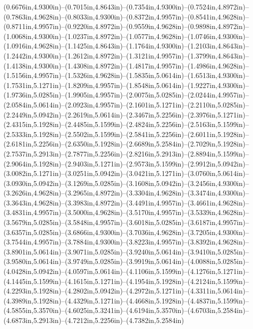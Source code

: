 (0.6676in,4.9300in)--(0.7015in,4.8643in)--(0.7354in,4.9300in)--(0.7524in,4.8972in)--(0.7863in,4.9628in)--(0.8033in,4.9300in)--(0.8372in,4.9957in)--(0.8541in,4.9628in)--(0.8711in,4.9957in)--(0.9220in,4.8972in)--(0.9559in,4.9628in)--(0.9898in,4.8972in)--(1.0068in,4.9300in)--(1.0237in,4.8972in)--(1.0577in,4.9628in)--(1.0746in,4.9300in)--(1.0916in,4.9628in)--(1.1425in,4.8643in)--(1.1764in,4.9300in)--(1.2103in,4.8643in)--(1.2442in,4.9300in)--(1.2612in,4.8972in)--(1.3121in,4.9957in)--(1.3799in,4.8643in)--(1.4138in,4.9300in)--(1.4308in,4.8972in)--(1.4817in,4.9957in)--(1.4986in,4.9628in)--(1.5156in,4.9957in)--(1.5326in,4.9628in)--(1.5835in,5.0614in)--(1.6513in,4.9300in)--(1.7531in,5.1271in)--(1.8209in,4.9957in)--(1.8548in,5.0614in)--(1.9227in,4.9300in)--(1.9736in,5.0285in)--(1.9905in,4.9957in)--(2.0075in,5.0285in)--(2.0244in,4.9957in)--(2.0584in,5.0614in)--(2.0923in,4.9957in)--(2.1601in,5.1271in)--(2.2110in,5.0285in)--(2.2449in,5.0942in)--(2.2619in,5.0614in)--(2.3467in,5.2256in)--(2.3976in,5.1271in)--(2.4315in,5.1928in)--(2.4485in,5.1599in)--(2.4824in,5.2256in)--(2.5163in,5.1599in)--(2.5333in,5.1928in)--(2.5502in,5.1599in)--(2.5841in,5.2256in)--(2.6011in,5.1928in)--(2.6181in,5.2256in)--(2.6350in,5.1928in)--(2.6689in,5.2584in)--(2.7029in,5.1928in)--(2.7537in,5.2913in)--(2.7877in,5.2256in)--(2.8216in,5.2913in)--(2.8894in,5.1599in)--(2.9064in,5.1928in)--(2.9403in,5.1271in)--(2.9573in,5.1599in)--(2.9912in,5.0942in)--(3.0082in,5.1271in)--(3.0251in,5.0942in)--(3.0421in,5.1271in)--(3.0760in,5.0614in)--(3.0930in,5.0942in)--(3.1269in,5.0285in)--(3.1608in,5.0942in)--(3.2456in,4.9300in)--(3.2626in,4.9628in)--(3.2965in,4.8972in)--(3.3304in,4.9628in)--(3.3474in,4.9300in)--(3.3643in,4.9628in)--(3.3983in,4.8972in)--(3.4491in,4.9957in)--(3.4661in,4.9628in)--(3.4831in,4.9957in)--(3.5000in,4.9628in)--(3.5170in,4.9957in)--(3.5339in,4.9628in)--(3.5679in,5.0285in)--(3.5848in,4.9957in)--(3.6018in,5.0285in)--(3.6187in,4.9957in)--(3.6357in,5.0285in)--(3.6866in,4.9300in)--(3.7036in,4.9628in)--(3.7205in,4.9300in)--(3.7544in,4.9957in)--(3.7884in,4.9300in)--(3.8223in,4.9957in)--(3.8392in,4.9628in)--(3.8901in,5.0614in)--(3.9071in,5.0285in)--(3.9240in,5.0614in)--(3.9410in,5.0285in)--(3.9580in,5.0614in)--(3.9749in,5.0285in)--(3.9919in,5.0614in)--(4.0088in,5.0285in)--(4.0428in,5.0942in)--(4.0597in,5.0614in)--(4.1106in,5.1599in)--(4.1276in,5.1271in)--(4.1445in,5.1599in)--(4.1615in,5.1271in)--(4.1954in,5.1928in)--(4.2124in,5.1599in)--(4.2293in,5.1928in)--(4.2802in,5.0942in)--(4.2972in,5.1271in)--(4.3311in,5.0614in)--(4.3989in,5.1928in)--(4.4329in,5.1271in)--(4.4668in,5.1928in)--(4.4837in,5.1599in)--(4.5855in,5.3570in)--(4.6025in,5.3241in)--(4.6194in,5.3570in)--(4.6703in,5.2584in)--(4.6873in,5.2913in)--(4.7212in,5.2256in)--(4.7382in,5.2584in) 